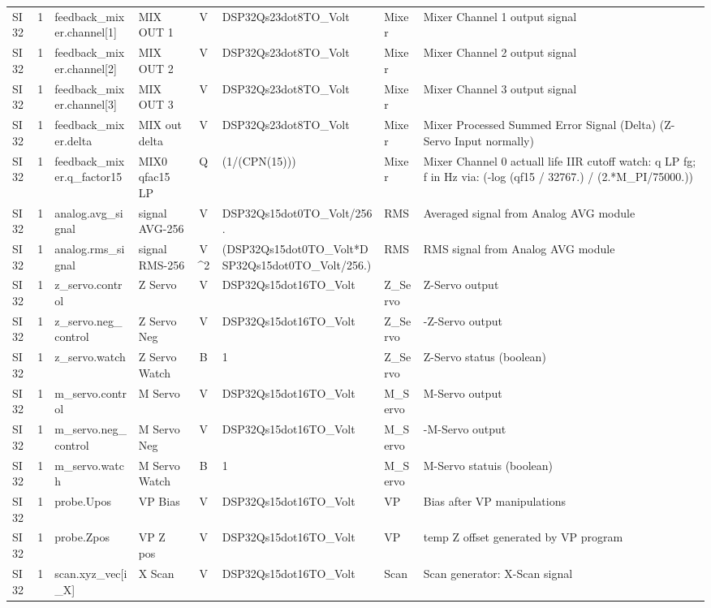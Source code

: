 \begin{tabular}{|l|r|l|l|c|l|l|l|}
SI32 & 1 & feedback\_mixer.channel[1] &  MIX OUT 1 &  V &  DSP32Qs23dot8TO\_Volt &  Mixer &  Mixer Channel 1 output signal \\
SI32 & 1 & feedback\_mixer.channel[2] &  MIX OUT 2 &  V &  DSP32Qs23dot8TO\_Volt &  Mixer &  Mixer Channel 2 output signal \\
SI32 & 1 & feedback\_mixer.channel[3] &  MIX OUT 3 &  V &  DSP32Qs23dot8TO\_Volt &  Mixer &  Mixer Channel 3 output signal \\
SI32 & 1 & feedback\_mixer.delta &  MIX out delta &       V &  DSP32Qs23dot8TO\_Volt &  Mixer &  Mixer Processed Summed Error Signal (Delta) (Z-Servo Input normally) \\
SI32 & 1 & feedback\_mixer.q\_factor15 & MIX0 qfac15 LP &   Q &        (1/(CPN(15))) &  Mixer &  Mixer Channel 0 actuall life IIR cutoff watch: q LP fg; f in Hz via: (-log (qf15 / 32767.) / (2.*M\_PI/75000.)) \\
SI32 & 1 & analog.avg\_signal &   signal AVG-256 &  V &    DSP32Qs15dot0TO\_Volt/256. &                         RMS &  Averaged signal from Analog AVG module \\
SI32 & 1 & analog.rms\_signal &   signal RMS-256 &  V^2 &  (DSP32Qs15dot0TO\_Volt*DSP32Qs15dot0TO\_Volt/256.) &  RMS &  RMS signal from Analog AVG module \\
SI32 & 1 & z\_servo.control &     Z Servo &       V &  DSP32Qs15dot16TO\_Volt &  Z\_Servo &  Z-Servo output \\
SI32 & 1 & z\_servo.neg\_control & Z Servo Neg &   V &  DSP32Qs15dot16TO\_Volt &  Z\_Servo &  -Z-Servo output \\
SI32 & 1 & z\_servo.watch &       Z Servo Watch &  B &                   1 &  Z\_Servo &  Z-Servo status (boolean) \\
SI32 & 1 & m\_servo.control &     M Servo &       V &  DSP32Qs15dot16TO\_Volt &  M\_Servo &  M-Servo output \\
SI32 & 1 & m\_servo.neg\_control & M Servo Neg &   V &  DSP32Qs15dot16TO\_Volt &  M\_Servo &  -M-Servo output \\
SI32 & 1 & m\_servo.watch &       M Servo Watch &  B &                   1 &  M\_Servo &  M-Servo statuis (boolean) \\
SI32 & 1 & probe.Upos &  VP Bias &   V &  DSP32Qs15dot16TO\_Volt &  VP &  Bias after VP manipulations \\
SI32 & 1 & probe.Zpos &  VP Z pos &  V &  DSP32Qs15dot16TO\_Volt &  VP &  temp Z offset generated by VP program \\
SI32 & 1 & scan.xyz\_vec[i\_X] &  X Scan &            V &  DSP32Qs15dot16TO\_Volt &  Scan &  Scan generator: X-Scan signal \\

\end{tabular}
